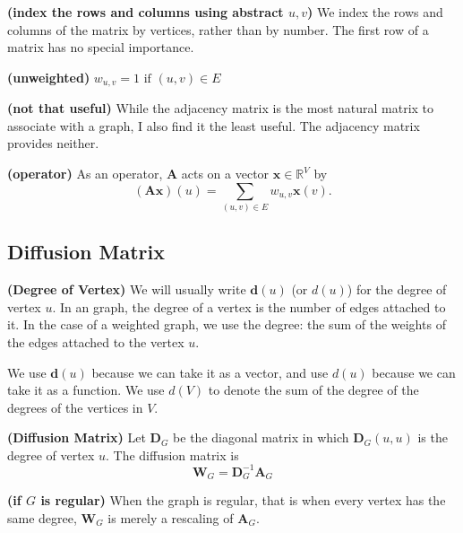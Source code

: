 \documentclass{article}
\newcommand{\bfs}[1]{\textbf{({#1}) }}
\begin{document}
\begin{rema}{\bfs{index the rows and columns using abstract $u,v$}}
We index the rows and columns of the matrix by vertices, rather than by number. The first row of a matrix has no special importance.
\end{rema}
\begin{rema}{\bfs{unweighted}}
$w_{u, v} = 1  \text { if }(u, v) \in E $
\end{rema}

\begin{rema}{\bfs{not that useful}}
While the adjacency matrix is the most natural matrix to associate with a graph, I also find it the least useful.  The adjacency matrix provides neither.
\end{rema}
\begin{rema}{\bfs{operator}}
As an operator, $\boldsymbol{A}$ acts on a vector $\boldsymbol{x} \in \mathbb{R}^{V}$ by
$$
(\boldsymbol{A x})(u)=\sum_{(u, v) \in E} w_{u, v} \boldsymbol{x}(v) .
$$
\end{rema}

\subsection{Diffusion Matrix}
\begin{defa}{\bfs{Degree of Vertex}}
We will usually write $\boldsymbol{d}(u)$ (or $d(u)$) for the degree of vertex $u$. In an  graph, the degree of a vertex is the number of edges attached to it. In the case of a weighted graph, we use the  degree: the sum of the weights of the edges attached to the vertex $u$.
\end{defa}
\begin{rema}
We use $\boldsymbol{d}(u)$ because we can take it as a vector, and use $d(u)$ because we can take it as a function. We use $d(V)$ to denote the sum of the degree of the degrees of the vertices in $V$.
\end{rema}
\begin{defa}{\bfs{Diffusion Matrix}}
Let $\boldsymbol{D}_{G}$ be the diagonal matrix in which $\boldsymbol{D}_{G}(u, u)$ is the degree of vertex $u$. 
The diffusion matrix is 
$$
\boldsymbol{W}_{G}=\boldsymbol{D}_{G}^{-1} \boldsymbol{A}_{G}
$$

\end{defa}

\begin{rema}{\bfs{if $G$ is regular}}
When the graph is regular, that is when every vertex has the same degree, $\boldsymbol{W}_{G}$ is merely a rescaling of $\boldsymbol{A}_{G}$.
\end{rema}
\end{document}
